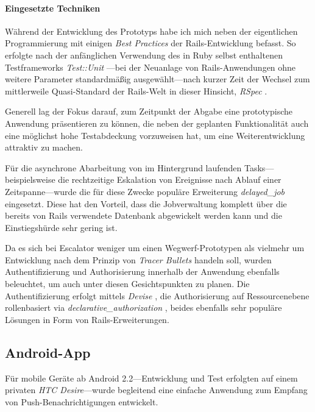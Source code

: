 \documentclass[11pt,utf8,notoc,bibnum,german,final]{zihpub}
\begin{document}

\paragraph{Eingesetzte Techniken}

Während der Entwicklung des Prototyps habe ich mich neben der eigentlichen
Programmierung mit einigen \emph{Best Practices} der Rails-Entwicklung befasst.
So erfolgte nach der anfänglichen Verwendung des in Ruby selbst enthaltenen
Testframeworks \emph{Test::Unit} \cite{testunit}—bei der Neuanlage von
Rails-Anwendungen ohne weitere Parameter standardmäßig ausgewählt—nach kurzer
Zeit der Wechsel zum mittlerweile Quasi-Standard der Rails-Welt in dieser
Hinsicht, \emph{RSpec} \cite{rspec}.


Generell lag der Fokus darauf, zum Zeitpunkt der Abgabe eine prototypische
Anwendung präsentieren zu können, die neben der geplanten Funktionalität auch
eine möglichst hohe Testabdeckung vorzuweisen hat, um eine Weiterentwicklung
attraktiv zu machen.

Für die asynchrone Abarbeitung von im Hintergrund laufenden
Tasks—beispielsweise die rechtzeitige Eskalation von Ereignisse nach Ablauf
einer Zeitspanne—wurde die für diese Zwecke populäre Erweiterung
\emph{delayed\_job} \cite{delayedjob} eingesetzt. Diese hat den Vorteil, dass
die Jobverwaltung komplett über die bereits von Rails verwendete Datenbank
abgewickelt werden kann und die Einstiegshürde sehr gering ist.

Da es sich bei Escalator weniger um einen Wegwerf-Prototypen als vielmehr um
Entwicklung nach dem Prinzip von \emph{Tracer Bullets} \cite{tracerbullets}
handeln soll, wurden Authentifizierung und Authorisierung innerhalb der
Anwendung ebenfalls beleuchtet, um auch unter diesen Gesichtspunkten zu planen.
Die Authentifizierung erfolgt mittels \emph{Devise} \cite{devise}, die
Authorisierung auf Ressourcenebene rollenbasiert via
\emph{declarative\_authorization} \cite{declarative-authorization}, beides
ebenfalls sehr populäre Lösungen in Form von Rails-Erweiterungen.

\subsection{Android-App}

Für mobile Geräte ab Android 2.2—Entwicklung und Test erfolgten auf einem
privaten \emph{HTC Desire}—wurde begleitend eine einfache Anwendung zum Empfang
von Push-Benachrichtigungen entwickelt.
\end{document}
